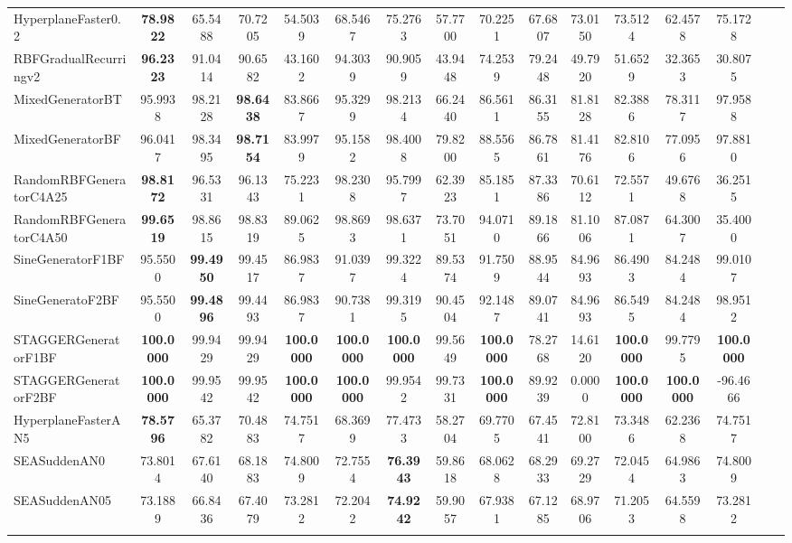 \documentclass[reqno]{vcuthesis}
\numberwithin{equation}{chapter}
\begin{document}
\begin{table}[b!]
{\begin{tabularx}{1.55\textwidth}{l@{\extracolsep{\fill}}ccccccccccccccc}
HyperplaneFaster0.2 &\textbf{78.9822} &65.5488 &70.7205 &54.5039 &68.5467 &75.2763 &57.7700 &70.2251 &67.6807 &73.0150 &73.5124 &62.4578 &75.1728 &  \\
RBFGradualRecurringv2 &\textbf{96.2323} &91.0414 &90.6582 &43.1602 &94.3039 &90.9059 &43.9448 &74.2539 &79.2448 &49.7920 &51.6529 &32.3653 &30.8075 &  \\
MixedGeneratorBT &95.9938 &98.2128 &\textbf{98.6438} &83.8667 &95.3299 &98.2134 &66.2440 &86.5611 &86.3155 &81.8128 &82.3886 &78.3117 &97.9588 &  \\
MixedGeneratorBF &96.0417 &98.3495 &\textbf{98.7154} &83.9979 &95.1582 &98.4008 &79.8200 &88.5565 &86.7861 &81.4176 &82.8106 &77.0956 &97.8810 &  \\
RandomRBFGeneratorC4A25 &\textbf{98.8172} &96.5331 &96.1343 &75.2231 &98.2308 &95.7997 &62.3923 &85.1851 &87.3386 &70.6112 &72.5571 &49.6768 &36.2515 &  \\
RandomRBFGeneratorC4A50 &\textbf{99.6519} &98.8615 &98.8319 &89.0625 &98.8693 &98.6371 &73.7051 &94.0710 &89.1866 &81.1006 &87.0871 &64.3007 &35.4000 &  \\
SineGeneratorF1BF &95.5500 &\textbf{99.4950} &99.4517 &86.9837 &91.0397 &99.3224 &89.5374 &91.7509 &88.9544 &84.9693 &86.4903 &84.2484 &99.0107 &  \\
SineGeneratoF2BF &95.5500 &\textbf{99.4896} &99.4493 &86.9837 &90.7381 &99.3195 &90.4504 &92.1487 &89.0741 &84.9693 &86.5495 &84.2484 &98.9512 &  \\
STAGGERGeneratorF1BF &\textbf{100.0000} &99.9429 &99.9429 &\textbf{100.0000} &\textbf{100.0000} &\textbf{100.0000} &99.5649 &\textbf{100.0000} &78.2768 &14.6120 &\textbf{100.0000} &99.7795 &\textbf{100.0000} &  \\
STAGGERGeneratorF2BF &\textbf{100.0000} &99.9542 &99.9542 &\textbf{100.0000} &\textbf{100.0000} &99.9542 &99.7331 &\textbf{100.0000} &89.9239 &0.0000 &\textbf{100.0000} &\textbf{100.0000} &-96.4666 &  \\
HyperplaneFasterAN5 &\textbf{78.5796} &65.3782 &70.4883 &74.7517 &68.3699 &77.4733 &58.2704 &69.7705 &67.4541 &72.8100 &73.3486 &62.2368 &74.7517 &  \\
SEASuddenAN0 &73.8014 &67.6140 &68.1883 &74.8009 &72.7554 &\textbf{76.3943} &59.8618 &68.0628 &68.2933 &69.2729 &72.0454 &64.9863 &74.8009 &  \\
SEASuddenAN05 &73.1889 &66.8436 &67.4079 &73.2812 &72.2042 &\textbf{74.9242} &59.9057 &67.9381 &67.1285 &68.9706 &71.2053 &64.5598 &73.2812 &  \\
\noalign{\smallskip}\hline\noalign{\smallskip}

\end{tabularx}}
\end{table}
\end{document}
